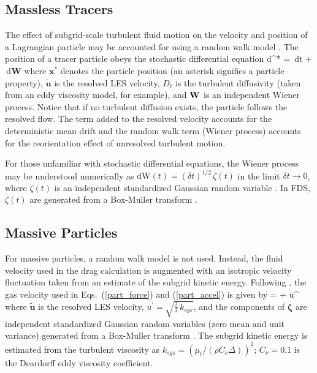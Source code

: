 \subsection{Massless Tracers}

The effect of subgrid-scale turbulent fluid motion on the velocity and position of a Lagrangian particle may be accounted for using a random walk model \cite{Raman:CF}.  The position of a tracer particle obeys the stochastic differential equation
\be
\mbox{d}^* =  \,\mbox{d}t +  \,\mbox{d}\mbox{\textbf{W}}
\ee
where $\mathbf{x}^*$ denotes the particle position (an asterisk signifies a particle property), $\tilde{\mathbf{u}}$ is the resolved LES velocity, $D_t$ is the turbulent diffusivity (taken from an eddy viscosity model, for example), and $\mbox{\textbf{W}}$ is an independent Wiener process.  Notice that if no turbulent diffusion exists, the particle follows the resolved flow.  The term added to the resolved velocity accounts for the deterministic mean drift and the random walk term (Wiener process) accounts for the reorientation effect of unresolved turbulent motion.

For those unfamiliar with stochastic differential equations, the Wiener process may be understood numerically as $\mbox{dW}(t) = (\delta t)^{1/2} \, \zeta(t)$ in the limit $\delta t \rightarrow 0$, where $\zeta(t)$ is an independent standardized Gaussian random variable \cite{Pope:2000}.  In FDS, $\zeta(t)$ are generated from a Box-Muller transform \cite{Box-Muller:1958}.

\subsection{Massive Particles}

For massive particles, a random walk model is not used.  Instead, the fluid velocity used in the drag calculation is augmented with an isotropic velocity fluctuation taken from an estimate of the subgrid kinetic energy.  Following \cite{Breuer:2012}, the gas velocity used in Eqs.~(\ref{part_force}) and (\ref{part_accel}) is given by
\be
{} =  + u^\prime \, {\bm \zeta}
\ee
where $\tilde{\mathbf{u}}$ is the resolved LES velocity, $u^\prime = \sqrt{\frac{2}{3}\,k_{sgs}}$, and the components of $\bm \zeta$ are independent standardized Gaussian random variables (zero mean and unit variance) generated from a Box-Muller transform \cite{Box-Muller:1958}.  The subgrid kinetic energy is estimated from the turbulent viscosity as $k_{sgs} = (\mu_t/(\rho C_{\nu} \Delta))^2$; $C_\nu = 0.1$ is the Deardorff eddy viscosity coefficient.



